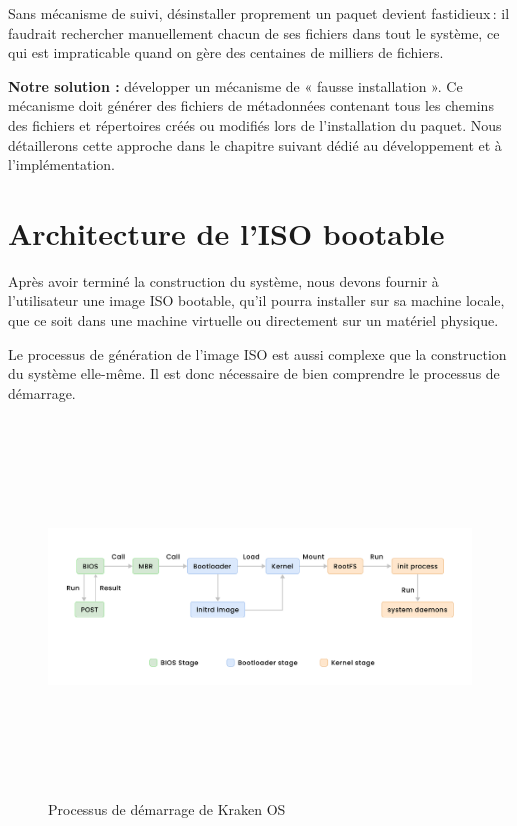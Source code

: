 Sans mécanisme de suivi, désinstaller proprement un paquet devient fastidieux : il faudrait rechercher manuellement chacun de ses fichiers dans tout le système, ce qui est impraticable quand on gère des centaines de milliers de fichiers.

\textbf{Notre solution :} développer un mécanisme de « fausse installation ». Ce mécanisme doit générer des fichiers de métadonnées contenant tous les chemins des fichiers et répertoires créés ou modifiés lors de l’installation du paquet. Nous détaillerons cette approche dans le chapitre suivant dédié au développement et à l’implémentation.





\clearpage
\section{Architecture de l’ISO bootable}

Après avoir terminé la construction du système, nous devons fournir à l’utilisateur une image ISO bootable, qu’il pourra installer sur sa machine locale, que ce soit dans une machine virtuelle ou directement sur un matériel physique.

Le processus de génération de l’image ISO est aussi complexe que la construction du système elle-même. Il est donc nécessaire de bien comprendre le processus de démarrage.

\begin{figure}[H]
  \centering
  \includegraphics[width=1\textwidth, height=10cm]{images_pfe/bootloader process.png}
  \caption{Processus de démarrage de Kraken OS}
  \label{fig:kbootproc}
\end{figure}



